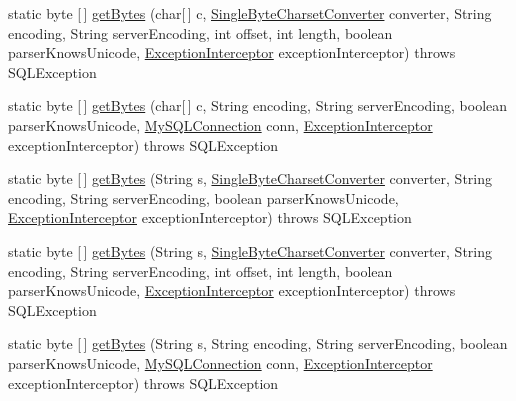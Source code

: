 \begin{DoxyCompactItemize}
static byte \mbox{[}$\,$\mbox{]} \mbox{\hyperlink{classcom_1_1mysql_1_1jdbc_1_1_string_utils_afa77878bbb64c7649486eab195b72185}{get\+Bytes}} (char\mbox{[}$\,$\mbox{]} c, \mbox{\hyperlink{classcom_1_1mysql_1_1jdbc_1_1_single_byte_charset_converter}{Single\+Byte\+Charset\+Converter}} converter, String encoding, String server\+Encoding, int offset, int length, boolean parser\+Knows\+Unicode, \mbox{\hyperlink{interfacecom_1_1mysql_1_1jdbc_1_1_exception_interceptor}{Exception\+Interceptor}} exception\+Interceptor)  throws S\+Q\+L\+Exception 
\item 
static byte \mbox{[}$\,$\mbox{]} \mbox{\hyperlink{classcom_1_1mysql_1_1jdbc_1_1_string_utils_a4997696bd5f691e1bdfe5b41dec49be1}{get\+Bytes}} (char\mbox{[}$\,$\mbox{]} c, String encoding, String server\+Encoding, boolean parser\+Knows\+Unicode, \mbox{\hyperlink{interfacecom_1_1mysql_1_1jdbc_1_1_my_s_q_l_connection}{My\+S\+Q\+L\+Connection}} conn, \mbox{\hyperlink{interfacecom_1_1mysql_1_1jdbc_1_1_exception_interceptor}{Exception\+Interceptor}} exception\+Interceptor)  throws S\+Q\+L\+Exception 
\item 
static byte \mbox{[}$\,$\mbox{]} \mbox{\hyperlink{classcom_1_1mysql_1_1jdbc_1_1_string_utils_a7ccf9deb162f278f270b455040e8aa03}{get\+Bytes}} (String s, \mbox{\hyperlink{classcom_1_1mysql_1_1jdbc_1_1_single_byte_charset_converter}{Single\+Byte\+Charset\+Converter}} converter, String encoding, String server\+Encoding, boolean parser\+Knows\+Unicode, \mbox{\hyperlink{interfacecom_1_1mysql_1_1jdbc_1_1_exception_interceptor}{Exception\+Interceptor}} exception\+Interceptor)  throws S\+Q\+L\+Exception 
\item 
static byte \mbox{[}$\,$\mbox{]} \mbox{\hyperlink{classcom_1_1mysql_1_1jdbc_1_1_string_utils_a08b655dc82143b3bff5c4af85cafb9c0}{get\+Bytes}} (String s, \mbox{\hyperlink{classcom_1_1mysql_1_1jdbc_1_1_single_byte_charset_converter}{Single\+Byte\+Charset\+Converter}} converter, String encoding, String server\+Encoding, int offset, int length, boolean parser\+Knows\+Unicode, \mbox{\hyperlink{interfacecom_1_1mysql_1_1jdbc_1_1_exception_interceptor}{Exception\+Interceptor}} exception\+Interceptor)  throws S\+Q\+L\+Exception 
\item 
static byte \mbox{[}$\,$\mbox{]} \mbox{\hyperlink{classcom_1_1mysql_1_1jdbc_1_1_string_utils_a6b5fe6d3bbd403144a59f29d4fb9984a}{get\+Bytes}} (String s, String encoding, String server\+Encoding, boolean parser\+Knows\+Unicode, \mbox{\hyperlink{interfacecom_1_1mysql_1_1jdbc_1_1_my_s_q_l_connection}{My\+S\+Q\+L\+Connection}} conn, \mbox{\hyperlink{interfacecom_1_1mysql_1_1jdbc_1_1_exception_interceptor}{Exception\+Interceptor}} exception\+Interceptor)  throws S\+Q\+L\+Exception 

\end{DoxyCompactItemize}
